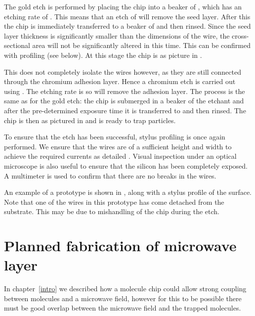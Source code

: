 The gold etch is performed by placing the chip into a beaker of , which has an etching rate of . This means that an
etch of  will remove the seed layer. After this the
chip is immediately transferred to a beaker of  and then rinsed. Since
the seed layer thickness is significantly smaller than the dimensions of the
wire, the cross-sectional area will not be significantly altered in this time.
This can be confirmed with profiling (see below). At this stage the chip is as
picture in .

%
This does not completely isolate the wires however, as they are still connected
through the chromium adhesion layer. Hence a chromium etch is carried out using
. The etching rate is  so  will
remove the adhesion layer. The process is the same as for the gold etch: the
chip is submerged in a beaker of the etchant and after the pre-determined
exposure time it is transferred to  and then rinsed. The chip is
then as pictured in  and is ready to trap
particles.

To ensure that the etch has been successful, stylus profiling is once again
performed. We ensure that the wires are of a sufficient height and width to
achieve the required currents as detailed . Visual
inspection under an optical microscope is also useful to ensure that the
silicon has been completely exposed. A multimeter is used to confirm that there
are no breaks in the wires.

An example of a prototype  is shown in
, along with a stylus profile of the surface. Note
that one of the wires in this prototype has come detached from the substrate.
This may be due to mishandling of the chip during the etch.

\begin{figure}
\centering
  \caption{}
  \label{fab:fig:protoype}
\end{figure}

\section{Planned fabrication of microwave layer}
\label{fab:planned}

In chapter~\ref{intro} 
we described how a molecule chip could allow strong coupling between \CaF{}
molecules and a microwave field, however for this to be possible there must be
good overlap between the microwave field and the trapped
molecules.~\cite{Andre2006} 

